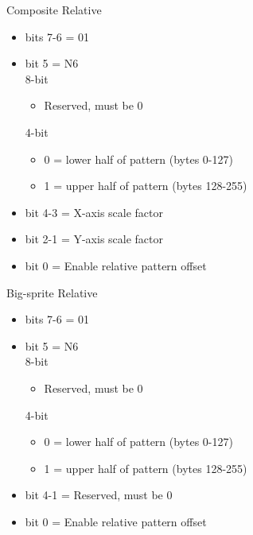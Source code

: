 Composite Relative
\begin{itemize}
\item[] bits 7-6 = 01
\item[] bit 5 = N6\\
  8-bit
  \begin{itemize}
  \item[] Reserved, must be 0
  \end{itemize}
  4-bit
  \begin{itemize}
  \item[] 0 = lower half of pattern (bytes 0-127)
  \item[] 1 = upper half of pattern (bytes 128-255)
  \end{itemize}
\item[] bit 4-3 = X-axis scale factor
\item[] bit 2-1 = Y-axis scale factor
\item[] bit 0 = Enable relative pattern offset
\end{itemize}
Big-sprite Relative
\begin{itemize}
\item[] bits 7-6 = 01
\item[] bit 5 = N6\\
  8-bit
  \begin{itemize}
  \item[] Reserved, must be 0
  \end{itemize}
  4-bit
  \begin{itemize}
  \item[] 0 = lower half of pattern (bytes 0-127)
  \item[] 1 = upper half of pattern (bytes 128-255)
  \end{itemize}
\item[] bit 4-1 = Reserved, must be 0
\item[] bit 0 = Enable relative pattern offset
\end{itemize}

